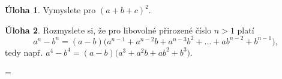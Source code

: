 \documentclass[11pt,a5paper]{article}
\theoremstyle{definition}
\newtheorem{uloha}{\atr Úloha}
\def\vysld{}
\let\printvysl\relax
\def\atr{}
\def\interest{\def\atr{\llap{$\star$ }\gdef\atr{}}}
\begin{document}
\begin{uloha}
Vymyslete  pro $(a+b+c)^2$.
\end{uloha}

\interest
\begin{uloha}
Rozmyslete si, že pro libovolné přirozené číslo $n > 1$ platí
\[ a^n - b^n = (a-b)\bigl(a^{n-1} + a^{n-2}b + a^{n-3}b^2 +  \dots + ab^{n-2} + b^{n-1}\bigr), \]
tedy např. $a^4 - b^4 = (a-b)\bigl(a^3 + a^2b + ab^2 + b^3\bigr)$.
\end{uloha}


\newpage
\parindent=0pt
\parskip=\smallskipamount
\def\printvysl#1#2{\textbf{#1.}\ #2\par}
\vysld
\end{document}
